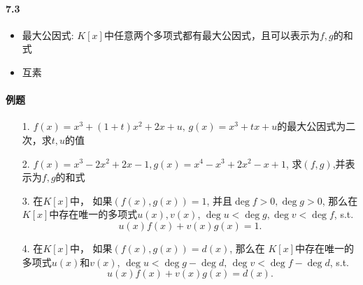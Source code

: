 \paragraph{7.3}
\begin{itemize}
  \item 最大公因式: $K[x]$中任意两个多项式都有最大公因式，且可以表示为$f,g$的和式
  \item 互素
\end{itemize}
\paragraph{例题}
\begin{itemize}
    \item[1.] $f(x)=x^3+(1+t)x^2+2x+u,\, g(x)=x^3+tx+u$的最大公因式为二次，求$t,u$的值
    \vspace{2cm}
    
    \item[2.] $f(x) = x^3-2x^2+2x-1, g(x)=x^4-x^3+2x^2-x+1$, 求$(f,g)$,并表示为$f,g$的和式
    \vspace{2cm}

    \item[3.] 在$K[x]$中， 如果$(f(x),g(x))=1$, 并且$\deg f >0, \deg g>0$, 那么在
    $K[x]$中存在唯一的多项式$u(x), v(x)$, $\deg u< \deg g, \deg v<\deg f$,
    s.t.
    $$u(x)f(x) +v(x)g(x) = 1.$$
    \vspace{2cm}

    \item[4.] 在$K[x]$中， 如果$(f(x),g(x))=d(x)$, 那么在
    $K[x]$中存在唯一的多项式$u(x)$和$v(x)$, $\deg u < \deg g - \deg d,\,
    \deg v<\deg f - \deg d$,
    s.t.
    $$u(x)f(x) +v(x)g(x) = d(x).$$
    \vspace{1cm}


\end{itemize}
